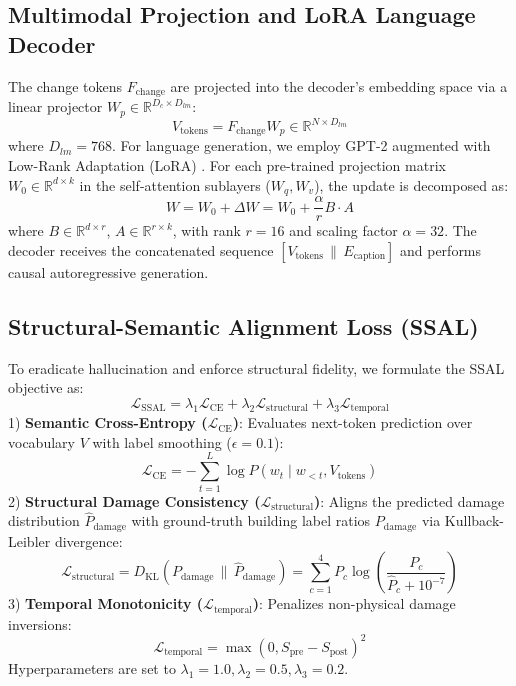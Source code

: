 \documentclass[conference]{IEEEtran}
\begin{document}
\subsection{Multimodal Projection and LoRA Language Decoder}
The change tokens $F_{\text{change}}$ are projected into the decoder's embedding space via a linear projector $W_p \in \mathbb{R}^{D_c \times D_{lm}}$:
\begin{equation}
V_{\text{tokens}} = F_{\text{change}} W_p \in \mathbb{R}^{N \times D_{lm}}
\end{equation}
where $D_{lm} = 768$. For language generation, we employ GPT-2 augmented with Low-Rank Adaptation (LoRA) \cite{hu2022lora}. For each pre-trained projection matrix $W_0 \in \mathbb{R}^{d \times k}$ in the self-attention sublayers ($W_q, W_v$), the update is decomposed as:
\begin{equation}
W = W_0 + \Delta W = W_0 + \frac{\alpha}{r} B \cdot A
\end{equation}
where $B \in \mathbb{R}^{d \times r}$, $A \in \mathbb{R}^{r \times k}$, with rank $r=16$ and scaling factor $\alpha=32$. The decoder receives the concatenated sequence $[V_{\text{tokens}} \,\|\, E_{\text{caption}}]$ and performs causal autoregressive generation.

\subsection{Structural-Semantic Alignment Loss (SSAL)}
To eradicate hallucination and enforce structural fidelity, we formulate the SSAL objective as:
\begin{equation}
\mathcal{L}_{\text{SSAL}} = \lambda_1 \mathcal{L}_{\text{CE}} + \lambda_2 \mathcal{L}_{\text{structural}} + \lambda_3 \mathcal{L}_{\text{temporal}}
\end{equation}
1) \textbf{Semantic Cross-Entropy ($\mathcal{L}_{\text{CE}}$)}: Evaluates next-token prediction over vocabulary $V$ with label smoothing ($\epsilon=0.1$):
\begin{equation}
\mathcal{L}_{\text{CE}} = -\sum_{t=1}^L \log P(w_t \mid w_{<t}, V_{\text{tokens}})
\end{equation}
2) \textbf{Structural Damage Consistency ($\mathcal{L}_{\text{structural}}$)}: Aligns the predicted damage distribution $\hat{P}_{\text{damage}}$ with ground-truth building label ratios $P_{\text{damage}}$ via Kullback-Leibler divergence:
\begin{equation}
\mathcal{L}_{\text{structural}} = D_{\text{KL}}\left(P_{\text{damage}} \,\|\, \hat{P}_{\text{damage}}\right) = \sum_{c=1}^4 P_c \log \left(\frac{P_c}{\hat{P}_c + 10^{-7}}\right)
\end{equation}
3) \textbf{Temporal Monotonicity ($\mathcal{L}_{\text{temporal}}$)}: Penalizes non-physical damage inversions:
\begin{equation}
\mathcal{L}_{\text{temporal}} = \max\left(0, S_{\text{pre}} - S_{\text{post}}\right)^2
\end{equation}
Hyperparameters are set to $\lambda_1 = 1.0, \lambda_2 = 0.5, \lambda_3 = 0.2$.
\end{document}
